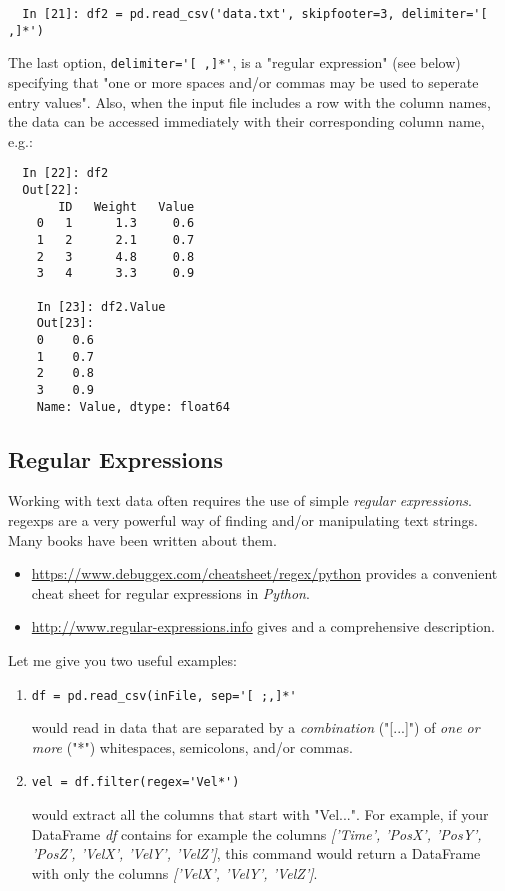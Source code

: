 \begin{lstlisting}
  In [21]: df2 = pd.read_csv('data.txt', skipfooter=3, delimiter='[ ,]*')
\end{lstlisting}

The last option, \lstinline{delimiter='[ ,]*'}, is a "regular expression" (see below) specifying that "one or more spaces and/or commas may be used to seperate entry values". Also, when the input file includes a row with the column names,  the data can be accessed immediately with their corresponding column name, e.g.:

\begin{lstlisting}
  In [22]: df2
  Out[22]:
       ID   Weight   Value
    0   1      1.3     0.6
    1   2      2.1     0.7
    2   3      4.8     0.8
    3   4      3.3     0.9

    In [23]: df2.Value
    Out[23]:
    0    0.6
    1    0.7
    2    0.8
    3    0.9
    Name: Value, dtype: float64
\end{lstlisting}

\subsection{Regular Expressions}

Working with text data often requires the use of simple \emph{regular expressions}. \Glspl{regexp} are a very powerful way of finding and/or manipulating text strings. Many books have been written about them.

\begin{itemize}
  \item \url{https://www.debuggex.com/cheatsheet/regex/python} provides a convenient cheat sheet for regular expressions in \emph{Python}.
  \item \url{http://www.regular-expressions.info} gives and a comprehensive description.
\end{itemize}

Let me give you two useful examples:

\begin{enumerate}
  \item \lstinline{df = pd.read_csv(inFile, sep='[ ;,]*'}

  would read in data that are separated by a \emph{combination} ("[...]") of \emph{one or more} ("*") whitespaces, semicolons, and/or commas.

  \item \lstinline{vel = df.filter(regex='Vel*')}

  would extract all the columns that start with "Vel...". For example, if your DataFrame \emph{df} contains for example the columns \emph{['Time', 'PosX', 'PosY', 'PosZ', 'VelX', 'VelY', 'VelZ']}, this command would return a DataFrame with only the columns \emph{['VelX', 'VelY', 'VelZ']}.
\end{enumerate}

